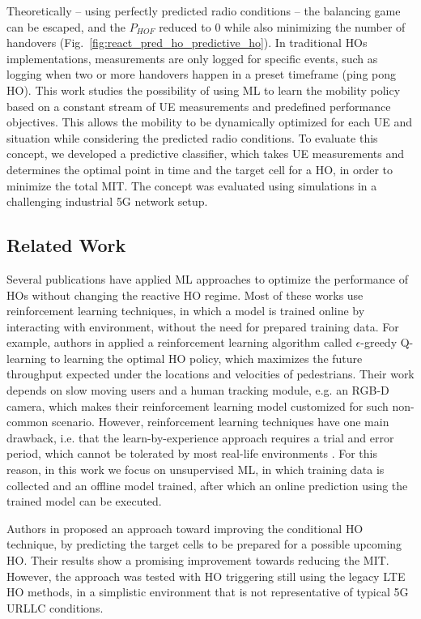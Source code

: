 			Theoretically -- using perfectly predicted radio conditions -- the balancing game can be escaped, and the $P_{HOF}$ reduced to $0$ while also minimizing the number of handovers (Fig.~\ref{fig:react_pred_ho_predictive_ho}).
			In traditional \acp{HO} implementations, measurements are only logged for specific events, such as logging when two or more handovers happen in a preset timeframe (ping pong \ac{HO}).
			This work studies the possibility of using \ac{ML} to learn the mobility policy based on a constant stream of \ac{UE} measurements and predefined performance objectives.
			This allows the mobility to be dynamically optimized for each \ac{UE} and situation while considering the predicted radio conditions.
			To evaluate this concept, we developed a predictive classifier, which takes \ac{UE} measurements and determines the optimal point in time and the target cell for a \ac{HO}, in order to minimize the total \ac{MIT}.
			The concept was evaluated using simulations in a challenging industrial \ac{5G} network setup.
		
		\subsection{Related Work}

			Several publications have applied \ac{ML} approaches to optimize the performance of \acp{HO} without changing the reactive \ac{HO} regime.
			Most of these works use reinforcement learning techniques, in which a model is trained online by interacting with environment, without the need for prepared training data.
			For example, authors in \cite{rlbasedpredictive} applied a reinforcement learning algorithm called $\epsilon$-greedy Q-learning to learning the optimal \ac{HO} policy, which maximizes the future throughput expected under the locations and velocities of pedestrians.
			Their work depends on slow moving users and a human tracking module, e.g. an RGB-D camera, which makes their reinforcement learning model customized for such non-common scenario.
			However, reinforcement learning techniques have one main drawback, i.e. that the learn-by-experience approach requires a trial and error period, which cannot be tolerated by most real-life environments \cite{rlbasics}.
			For this reason, in this work we focus on unsupervised \ac{ML}, in which training data is collected and an offline model trained, after which an online prediction using the trained model can be executed.
			
			Authors in \cite{predictionbasedcho} proposed an approach toward improving the conditional \ac{HO} technique, by predicting the target cells to be prepared for a possible upcoming \ac{HO}.
			Their results show a promising improvement towards reducing the \ac{MIT}.
			However, the approach was tested with \ac{HO} triggering still using the legacy \ac{LTE} \ac{HO} methods, in a simplistic environment that is not representative of typical 5G \ac{URLLC} conditions.
			
